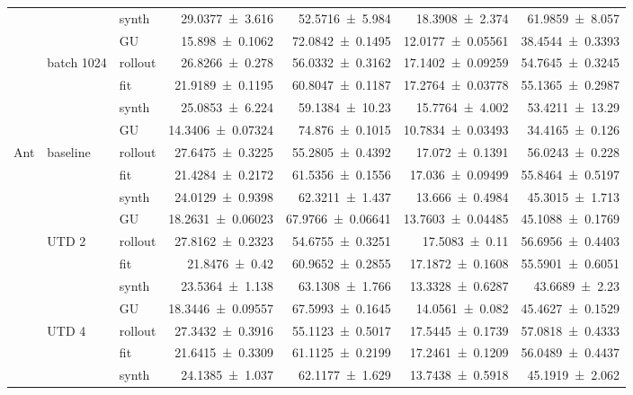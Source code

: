 {\begin{longtable}{@{}lllrrrr@{}}
     &  & synth & \num{29.0377+-3.616} & \num{52.5716+-5.984} & \num{18.3908+-2.374} & \num{61.9859+-8.057} \\
     &  & GU & \num{15.898+-0.1062} & \num{72.0842+-0.1495} & \num{12.0177+-0.05561} & \num{38.4544+-0.3393} \\
    \addlinespace[2pt]
     & batch 1024 & rollout & \num{26.8266+-0.278} & \num{56.0332+-0.3162} & \num{17.1402+-0.09259} & \num{54.7645+-0.3245} \\
     &  & fit & \num{21.9189+-0.1195} & \num{60.8047+-0.1187} & \num{17.2764+-0.03778} & \num{55.1365+-0.2987} \\
     &  & synth & \num{25.0853+-6.224} & \num{59.1384+-10.23} & \num{15.7764+-4.002} & \num{53.4211+-13.29} \\
     &  & GU & \num{14.3406+-0.07324} & \num{74.876+-0.1015} & \num{10.7834+-0.03493} & \num{34.4165+-0.126} \\
    \addlinespace[2pt]
    \midrule
    Ant & baseline & rollout & \num{27.6475+-0.3225} & \num{55.2805+-0.4392} & \num{17.072+-0.1391} & \num{56.0243+-0.228} \\
     &  & fit & \num{21.4284+-0.2172} & \num{61.5356+-0.1556} & \num{17.036+-0.09499} & \num{55.8464+-0.5197} \\
     &  & synth & \num{24.0129+-0.9398} & \num{62.3211+-1.437} & \num{13.666+-0.4984} & \num{45.3015+-1.713} \\
     &  & GU & \num{18.2631+-0.06023} & \num{67.9766+-0.06641} & \num{13.7603+-0.04485} & \num{45.1088+-0.1769} \\
    \addlinespace[2pt]
     & UTD 2 & rollout & \num{27.8162+-0.2323} & \num{54.6755+-0.3251} & \num{17.5083+-0.11} & \num{56.6956+-0.4403} \\
     &  & fit & \num{21.8476+-0.42} & \num{60.9652+-0.2855} & \num{17.1872+-0.1608} & \num{55.5901+-0.6051} \\
     &  & synth & \num{23.5364+-1.138} & \num{63.1308+-1.766} & \num{13.3328+-0.6287} & \num{43.6689+-2.23} \\
     &  & GU & \num{18.3446+-0.09557} & \num{67.5993+-0.1645} & \num{14.0561+-0.082} & \num{45.4627+-0.1529} \\
    \addlinespace[2pt]
     & UTD 4 & rollout & \num{27.3432+-0.3916} & \num{55.1123+-0.5017} & \num{17.5445+-0.1739} & \num{57.0818+-0.4333} \\
     &  & fit & \num{21.6415+-0.3309} & \num{61.1125+-0.2199} & \num{17.2461+-0.1209} & \num{56.0489+-0.4437} \\
     &  & synth & \num{24.1385+-1.037} & \num{62.1177+-1.629} & \num{13.7438+-0.5918} & \num{45.1919+-2.062} \\

\end{longtable}}
